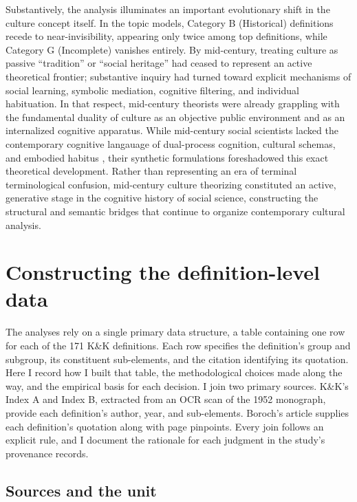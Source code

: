 \documentclass[11pt]{article}
\begin{document}
Substantively, the analysis illuminates an important evolutionary shift in the culture concept itself. In the topic models, Category B (Historical) definitions recede to near-invisibility, appearing only twice among top definitions, while Category G (Incomplete) vanishes entirely. By mid-century, treating culture as passive ``tradition'' or ``social heritage'' had ceased to represent an active theoretical frontier; substantive inquiry had turned toward explicit mechanisms of social learning, symbolic mediation, cognitive filtering, and individual habituation. In that respect, mid-century theorists were already grappling with the fundamental duality of culture as an objective public environment and as an internalized cognitive apparatus. While mid-century social scientists lacked the contemporary cognitive langauage of dual-process cognition, cultural schemas, and embodied habitus \citep{lizardo2017improving-c29}, their synthetic formulations foreshadowed this exact theoretical development. Rather than representing an era of terminal terminological confusion, mid-century culture theorizing constituted an active, generative stage in the cognitive history of social science, constructing the structural and semantic bridges that continue to organize contemporary cultural analysis.

\clearpage
\appendix

\renewcommand{\thesection}{Appendix \Alph{section}}
\renewcommand{\thesubsection}{\Alph{section}.\arabic{subsection}}
\section{Constructing the definition-level data}\label{app:construction}

The analyses rely on a single primary data structure, a table containing one row for each of the 171 K\&K definitions. Each row specifies the definition's group and subgroup, its constituent sub-elements, and the citation identifying its quotation. Here I record how I built that table, the methodological choices made along the way, and the empirical basis for each decision. I join two primary sources. K\&K's Index A and Index B, extracted from an OCR scan of the 1952 monograph, provide each definition's author, year, and sub-elements. Boroch's \citeyearpar{boroch2016} article supplies each definition's quotation along with page pinpoints. Every join follows an explicit rule, and I document the rationale for each judgment in the study's provenance records.

\subsection{Sources and the unit}
\end{document}

